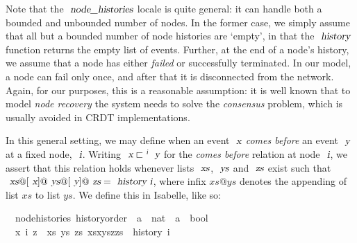 \documentclass[acmlarge,review,anonymous]{acmart}\settopmatter{printfolios=true}
\begin{document}
Note that the $\isa{node{\isacharunderscore}histories}$ locale is quite general: it can handle both a bounded and unbounded number of nodes.
In the former case, we simply assume that all but a bounded number of node histories are `empty', in that the $\isa{history}$ function returns the empty list of events.
Further, at the end of a node's history, we assume that a node has either \emph{failed} or successfully terminated.
In our model, a node can fail only once, and after that it is disconnected from the network.
Again, for our purposes, this is a reasonable assumption: it is well known that to model \emph{node recovery} the system needs to solve the \emph{consensus} problem, which is usually avoided in CRDT implementations.

In this general setting, we may define when an event $\isa{x}$ \emph{comes before} an event $\isa{y}$ at a fixed node, $\isa{i}$.
Writing $\isa{x} \sqsubset^\isa{i} \isa{y}$ for the \emph{comes before} relation at node $\isa{i}$, we assert that this relation holds whenever lists $\isa{xs}$, $\isa{ys}$ and $\isa{zs}$ exist such that $\isa{xs}@[\isa{x}]@\isa{ys}@[\isa{y}]@\isa{zs} = \isa{history\ i}$, where infix $xs@ys$ denotes the appending of list $xs$ to list $ys$.
We define this in Isabelle, like so:
\\
\begin{isabellebody}
\isamarkupfalse%
\ {\isacharparenleft}\ node{\isacharunderscore}histories{\isacharparenright}\ history{\isacharunderscore}order\ {\isacharcolon}{\isacharcolon}\ {\isachardoublequoteopen}{\isacharprime}a\ {\isasymRightarrow}\ nat\ {\isasymRightarrow}\ {\isacharprime}a\ {\isasymRightarrow}\ bool{\isachardoublequoteclose}\ {\isacharparenleft}{\isachardoublequoteopen}{\isacharunderscore}{\isacharslash}\ {\isasymsqsubset}\isactrlsup {\isacharunderscore}{\isacharslash}\ {\isacharunderscore}{\isachardoublequoteclose}\ {\isacharbrackleft}{}{}{\isacharcomma}{}{}{}{}{\isacharcomma}{}{}{\isacharbrackright}{}{}{\isacharparenright}\ \isanewline
\ \ {\isachardoublequoteopen}x\ {\isasymsqsubset}\isactrlsup i\ z\ {\isasymequiv}\ {\isasymexists}xs\ ys\ zs{\isachardot}\ xs{\isacharat}x{\isacharhash}ys{\isacharat}z{\isacharhash}zs\ {\isacharequal}\ history\ i{\isachardoublequoteclose}
\end{isabellebody}
\vspace{\baselineskip}
\end{document}

